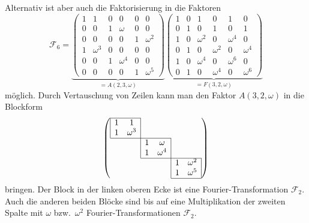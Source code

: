 Alternativ ist aber auch die Faktorisierung in die Faktoren
\[
\mathscr{F}_6
=
\underbrace{
\left(\begin{array}{cc|cc|cc}
1&       1&0&       0&0&       0\\
0&       0&1&  \omega&0&       0\\
0&       0&0&       0&1&\omega^2\\
\hline
1&\omega^3&0&       0&0&       0\\
0&       0&1&\omega^4&0&       0\\
0&       0&0&       0&1&\omega^5
\end{array}\right)
}_{\displaystyle =A(2,3,\omega)}
\underbrace{
\left(\begin{array}{cc|cc|cc}
1&0&       1&       0&       1&       0\\
0&1&       0&       1&       0&       1\\
\hline
1&0&\omega^2&       0&\omega^4&       0\\
0&1&       0&\omega^2&       0&\omega^4\\
\hline
1&0&\omega^4&       0&\omega^6&       0\\
0&1&       0&\omega^4&       0&\omega^6
\end{array}\right)
}_{\displaystyle =F(3,2,\omega)}
\]
möglich.
Durch Vertauschung von Zeilen kann man den Faktor $A(3,2,\omega)$ in die
Blockform
\[
\left(
\def\l#1{\multicolumn{1}{|c}{#1}}
\def\r#1{\multicolumn{1}{c|}{#1}}
\begin{array}{cccccc}
\cline{1-2}
\l{1}&\r{       1}&     &            &     &            \\
\l{1}&\r{\omega^3}&     &            &     &            \\
\cline{1-4}
     &            &\l{1}&\r{  \omega}&     &            \\
     &            &\l{1}&\r{\omega^4}&     &            \\
\cline{3-6}
     &            &     &            &\l{1}&\r{\omega^2}\\
     &            &     &            &\l{1}&\r{\omega^5}\\
\cline{5-6}
\end{array}
\right)
\]
bringen.
Der Block in der linken oberen Ecke ist eine Fourier-Transformation
$\mathscr{F}_2$.
Auch die anderen beiden Blöcke sind bis auf eine Multiplikation
der zweiten Spalte mit $\omega$ bzw.~$\omega^2$ Fourier-Transformationen
$\mathscr{F}_2$.

